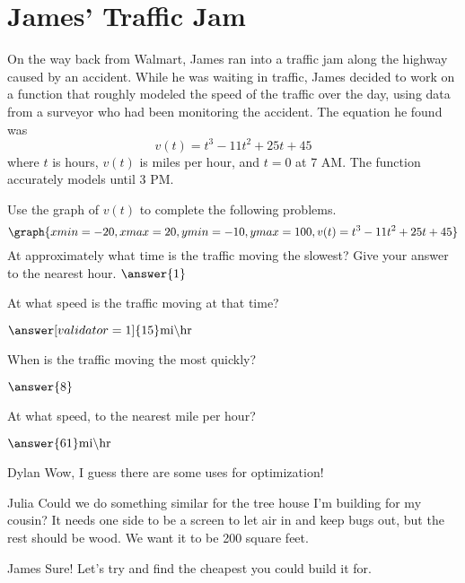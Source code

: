 \documentclass{ximera}
\begin{document}
\section{James' Traffic Jam}
On the way back from Walmart, James ran into a traffic jam along the highway caused by an accident. While he was waiting in traffic, James decided to work on a function that roughly modeled the speed of the traffic over the day, using data from a surveyor who had been monitoring the accident. The equation he found was $$v(t)=t^3-11t^2+25t+45$$ where $t$ is hours, $v(t)$ is miles per hour, and $t = 0$ at 7 AM. The function accurately models until 3 PM.
\begin{question}
Use the graph of $v(t)$ to complete the following problems.
\[
\graph{xmin=-20,xmax=20,ymin=-10,ymax=100,v(t)=t^3-11t^2+25t+45}
\]
At approximately what time is the traffic moving the slowest? Give your answer to the nearest hour.
$\answer{1}$
\begin{multipleChoice}
\end{multipleChoice}

At what speed is the traffic moving at that time?

$\answer[validator=1]{15} \text{mi} \backslash \text{hr}$

When is the traffic moving the most quickly?

$\answer{8}$\begin{multipleChoice}
\end{multipleChoice}

At what speed, to the nearest mile per hour?

$\answer{61} \text{mi} \backslash \text{hr}$

\end{question}
\begin{dialogue}
\item[Dylan] Wow, I guess there are some uses for optimization!
\item[Julia] Could we do something similar for the tree house I'm building for my cousin? It needs one side to be a screen to let air in and keep bugs out, but the rest should be wood. We want it to be 200 square feet.
\item[James] Sure! Let's try and find the cheapest you could build it for.
\end{dialogue}
\end{document}
